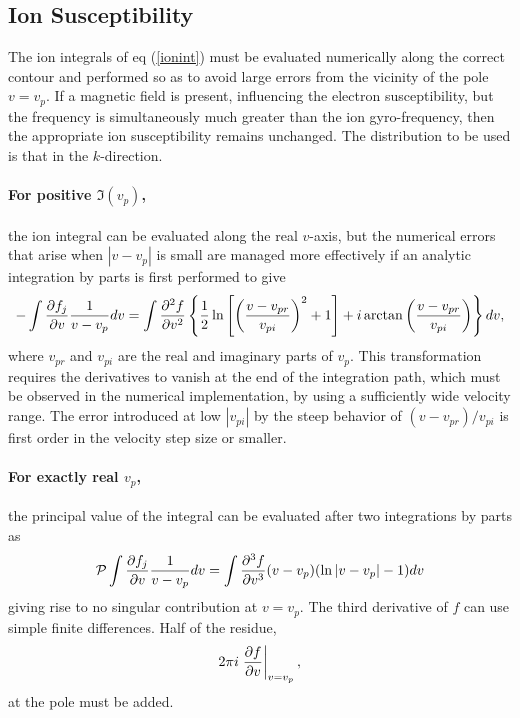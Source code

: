 \documentclass[12pt]{article}
\begin{document}
\subsection{Ion Susceptibility}

The ion integrals of eq (\ref{ionint}) must be evaluated numerically
along the correct contour and performed so as to avoid large errors
from the vicinity of the pole $v=v_p$. If a magnetic field is present,
influencing the electron susceptibility, but the frequency is
simultaneously much greater than the ion gyro-frequency, then the
appropriate ion susceptibility remains unchanged. The distribution to
be used is that in the $k$-direction.


\paragraph{For positive $\Im(v_p)$,} the ion integral can be evaluated along the real $v$-axis, but
the numerical errors that arise when $|v-v_p|$ is small are managed more
effectively if an analytic integration by parts is first performed to
give
\begin{equation}
-\int  {\partial
    f_j\over \partial v } {1\over v- v_p} dv =  
\int{\partial^2 f\over \partial v^2} 
\left\{ {1\over 2} \ln\left[\left(v-v_{pr}\over v_{pi}\right)^2+1\right] 
+ i \arctan\left(v-v_{pr}\over v_{pi}\right) \right\} dv ,
\end{equation}
where $v_{pr}$ and $v_{pi}$ are the real and imaginary parts of
$v_p$. This transformation requires the derivatives to vanish at the
end of the integration path, which must be observed in the numerical
implementation, by using a sufficiently wide velocity range. The error
introduced at low $|v_{pi}|$ by the steep behavior of
$(v-v_{pr})/v_{pi}$ is first order in the velocity step size or
smaller.

\paragraph{For exactly real $v_p$,} the principal value of the integral can be
evaluated after two integrations by parts as 
\begin{equation}
 {\cal P}\int  {\partial
    f_j\over \partial v } {1\over v- v_p} dv =
\int{\partial^3 f\over \partial v^3} 
(v-v_p) (\ln|v-v_p|-1) dv
\end{equation}
giving rise to no singular contribution at $v=v_p$. The third
derivative of $f$ can use simple finite differences. Half of the residue,
\begin{equation}\label{residue}
  2\pi i \left.\partial f\over \partial v\right|_{v=v_p} ,
\end{equation}
at the pole must be added.
\end{document}
